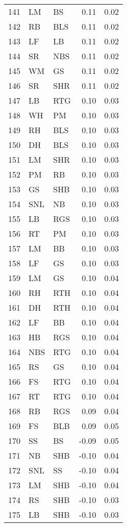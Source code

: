 \begin{table}[ht]
\begin{tabular}{rllrr}
  141 & LM & BS & 0.11 & 0.02 \\ 
  142 & RB & BLS & 0.11 & 0.02 \\ 
  143 & LF & LB & 0.11 & 0.02 \\ 
  144 & SR & NBS & 0.11 & 0.02 \\ 
  145 & WM & GS & 0.11 & 0.02 \\ 
  146 & SR & SHR & 0.11 & 0.02 \\ 
  147 & LB & RTG & 0.10 & 0.03 \\ 
  148 & WH & PM & 0.10 & 0.03 \\ 
  149 & RH & BLS & 0.10 & 0.03 \\ 
  150 & DH & BLS & 0.10 & 0.03 \\ 
  151 & LM & SHR & 0.10 & 0.03 \\ 
  152 & PM & RB & 0.10 & 0.03 \\ 
  153 & GS & SHB & 0.10 & 0.03 \\ 
  154 & SNL & NB & 0.10 & 0.03 \\ 
  155 & LB & RGS & 0.10 & 0.03 \\ 
  156 & RT & PM & 0.10 & 0.03 \\ 
  157 & LM & BB & 0.10 & 0.03 \\ 
  158 & LF & GS & 0.10 & 0.03 \\ 
  159 & LM & GS & 0.10 & 0.04 \\ 
  160 & RH & RTH & 0.10 & 0.04 \\ 
  161 & DH & RTH & 0.10 & 0.04 \\ 
  162 & LF & BB & 0.10 & 0.04 \\ 
  163 & HB & RGS & 0.10 & 0.04 \\ 
  164 & NBS & RTG & 0.10 & 0.04 \\ 
  165 & RS & GS & 0.10 & 0.04 \\ 
  166 & FS & RTG & 0.10 & 0.04 \\ 
  167 & RT & RTG & 0.10 & 0.04 \\ 
  168 & RB & RGS & 0.09 & 0.04 \\ 
  169 & FS & BLB & 0.09 & 0.05 \\ 
  170 & SS & BS & -0.09 & 0.05 \\ 
  171 & NB & SHB & -0.10 & 0.04 \\ 
  172 & SNL & SS & -0.10 & 0.04 \\ 
  173 & LM & SHB & -0.10 & 0.04 \\ 
  174 & RS & SHB & -0.10 & 0.03 \\ 
  175 & LB & SHB & -0.10 & 0.03 \\ 

\end{tabular}
\end{table}
